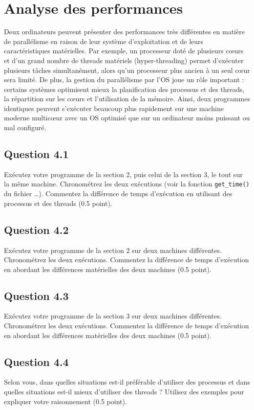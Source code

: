 \documentclass[12pt,addpoints]{exam} %
\begin{document}
\vspace{1cm}
\section{Analyse des performances}
Deux ordinateurs peuvent présenter des performances très différentes en matière de parallélisme en raison de leur système d’exploitation et de leurs caractéristiques matérielles. Par exemple, un processeur doté de plusieurs cœurs et d’un grand nombre de threads matériels (hyper-threading) permet d’exécuter plusieurs tâches simultanément, alors qu’un processeur plus ancien à un seul cœur sera limité. De plus, la gestion du parallélisme par l’OS joue un rôle important : certains systèmes optimisent mieux la planification des processus et des threads, la répartition sur les cœurs et l’utilisation de la mémoire. Ainsi, deux programmes identiques peuvent s’exécuter beaucoup plus rapidement sur une machine moderne multicœur avec un OS optimisé que sur un ordinateur moins puissant ou mal configuré.


\subsection*{Question 4.1}
Exécutez votre programme de la section 2, puis celui de la section 3, le tout sur la même machine. Chronométrez les deux exécutions (voir la fonction \texttt{get\_time()} du fichier …). Commentez la différence de temps d’exécution en utilisant des processus et des threads (0.5 point).


\subsection*{Question 4.2}
Exécutez votre programme de la section 2 sur deux machines différentes. Chronométrez les deux exécutions. Commentez la différence de temps d’exécution en abordant les différences matérielles des deux machines (0.5 point).


\subsection*{Question 4.3}
Exécutez votre programme de la section 3 sur deux machines différentes. Chronométrez les deux exécutions. Commentez la différence de temps d’exécution en abordant les différences matérielles des deux machines (0.5 point).


\subsection*{Question 4.4}
Selon vous, dans quelles situations est-il préférable d’utiliser des processus et dans quelles situations est-il mieux d’utiliser des threads ? Utilisez des exemples pour expliquer votre raisonnement (0.5 point).
\end{document}
